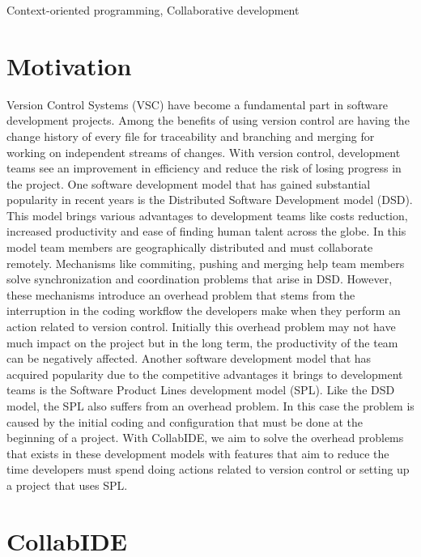 \documentclass[10pt, conference, draft]{IEEEtran}
\begin{document}
%
%
\begin{IEEEkeywords}
Context-oriented programming, Collaborative development
\end{IEEEkeywords}


\IEEEpeerreviewmaketitle


\section{Motivation}
\label{sec:motivation}

Version Control Systems (VSC) have become a fundamental part in software development projects. Among the benefits of using version control are having the change history of every file for traceability and branching and merging for working on independent streams of changes. With version control, development teams see an improvement in efficiency and reduce the risk of losing progress in the project.
One software development model that has gained substantial popularity in recent years is the Distributed Software Development model (DSD). This model brings various advantages to development teams like costs reduction, increased productivity and ease of finding human talent across the globe. In this model team members are geographically distributed and must collaborate remotely. Mechanisms like commiting, pushing and merging help team members solve synchronization and coordination problems that arise in DSD. However, these mechanisms introduce an overhead problem that stems from the interruption in the coding workflow the developers make when they perform an action related to version control. Initially this overhead problem may not have much impact on the project but in the long term, the productivity of the team can be negatively affected.
Another software development model that has acquired popularity due to the competitive advantages it brings to development teams is the Software Product Lines development model (SPL). Like the DSD model, the SPL also suffers from an overhead problem. In this case the problem is caused by the initial coding and configuration that must be done at the beginning of a project.
With CollabIDE, we aim to solve the overhead problems that exists in these development models with features that aim to reduce the time developers must spend doing actions related to version control or setting up a project that uses SPL.

\section{CollabIDE}
\label{sec:collab-ide}
\end{document}
